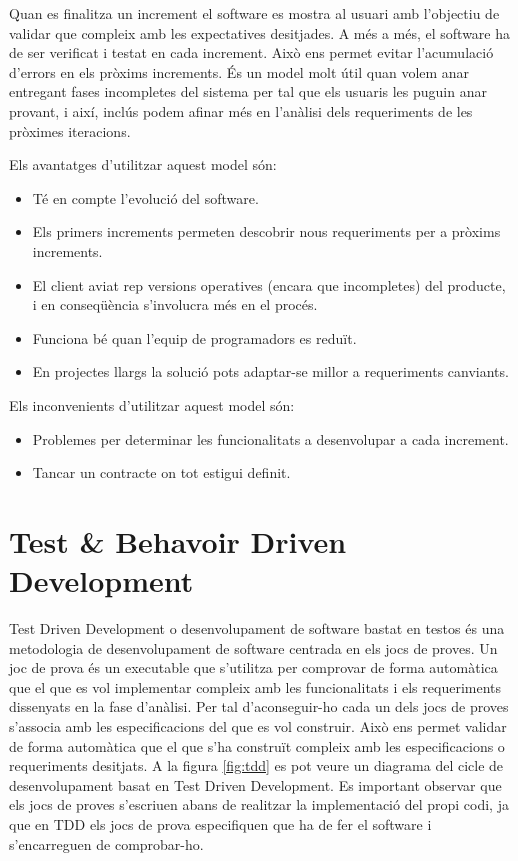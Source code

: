 Quan es finalitza un increment el software es mostra al usuari amb l'objectiu de validar que compleix amb les expectatives desitjades. A més a més, el software ha de ser verificat i testat en cada increment. Això ens permet evitar l'acumulació d'errors en els pròxims increments. És un model molt útil quan volem anar entregant fases incompletes del sistema per tal que els usuaris les puguin anar provant, i així, inclús podem afinar més en l’anàlisi dels requeriments de les pròximes iteracions.

Els avantatges d’utilitzar aquest model són:

\begin{itemize}
\item{Té en compte l’evolució del software.}
\item{Els primers increments permeten descobrir nous requeriments per a pròxims increments.}
\item{El client aviat rep versions operatives (encara que incompletes) del producte, i en conseqüència s’involucra més en el procés.}
\item{Funciona bé quan l’equip de programadors es reduït.}
\item{En projectes llargs la solució pots adaptar-se millor a requeriments canviants.}
\end{itemize}

Els inconvenients d’utilitzar aquest model són:

\begin{itemize}
\item{Problemes per determinar les funcionalitats a desenvolupar a cada increment.}
\item{Tancar un contracte on tot estigui definit.}
\end{itemize}


\section{Test \& Behavoir Driven Development}
\label{sec:tdd}

Test Driven Development o desenvolupament de software bastat en testos és una metodologia de desenvolupament de software centrada en els jocs de proves. Un joc de prova és un executable que s'utilitza per comprovar de forma automàtica que el que es vol implementar compleix amb les funcionalitats i els requeriments dissenyats en la fase d'anàlisi. Per tal d'aconseguir-ho cada un dels jocs de proves s'associa amb les especificacions del que es vol construir. Això ens permet validar de forma automàtica que el que s'ha construït compleix amb les especificacions o requeriments desitjats. A la figura \ref{fig:tdd} es pot veure un diagrama del cicle de desenvolupament basat en Test Driven Development. Es important observar que els jocs de proves s'escriuen abans de realitzar la implementació del propi codi, ja que en TDD els jocs de prova especifiquen que ha de fer el software i s'encarreguen de comprobar-ho.

